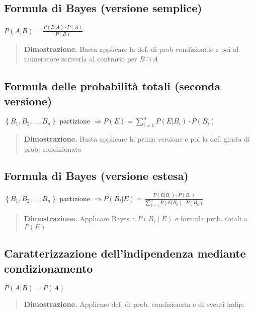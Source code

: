\documentclass[a4paper,10pt]{article}
\theoremstyle{remark}
\theoremstyle{definition}
\newenvironment{dimo}{\begin{quote}\textbf{Dimostrazione.}}{\end{quote}} %
\begin{document}
\subsection*{Formula di Bayes (versione semplice)}

$P\left(A|B\right)=\frac{P\left(B|A\right)\cdot P\left(A\right)}{P\left(B\right)}$

\begin{dimo}
    Basta applicare la def. di prob condizionale e poi al numeratore scriverla al contrario per $B\cap A$
\end{dimo}

\subsection*{Formula delle probabilità totali (seconda versione)}

$\left\{ B_{1},B_{2},\ldots,B_{n}\right\} \text{ partizione }\Longrightarrow P\left(E\right)=\sum_{i=1}^{n}P\left(E|B_{i}\right)\cdot P\left(B_{i}\right)$

\begin{dimo}
    Basta applicare la prima versione e poi la def. girata di prob. condizionata
\end{dimo}

\subsection*{Formula di Bayes (versione estesa)}

$\left\{ B_{1},B_{2},\ldots,B_{n}\right\} \text{ partizione }\Longrightarrow P\left(B_{i}|E\right)=\frac{P\left(E|B_{i}\right)\cdot P\left(B_{i}\right)}{\sum_{k=1}^{n}P\left(E|B_{k}\right)\cdot P\left(B_{k}\right)}$

\begin{dimo}
    Applicare Bayes a $P(B_i\mid E)$ e formula prob. totali a $P(E)$
\end{dimo}

\subsection*{Caratterizzazione dell\textquoteright indipendenza mediante condizionamento}

$P\left(A|B\right)=P\left(A\right)$

\begin{dimo}
    Applicare def. di prob. condizionata e di eventi indip.
\end{dimo}
\end{document}
